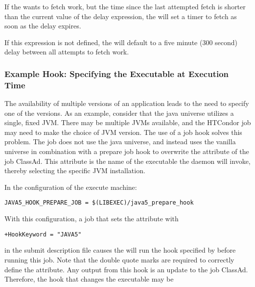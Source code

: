 If the  wants to fetch work, but the time since the
last attempted fetch is shorter than the current value of the delay
expression, the  will set a timer to fetch as soon as
the delay expires.

If this expression is not defined, the  will default to
a five minute (300 second) delay between all attempts to fetch work.

\subsubsection{\label{sec:job-hooks-example}
Example Hook: Specifying the Executable at Execution Time}

The availability of multiple versions of an application leads to
the need to specify one of the versions. 
As an example, consider that 
the java universe utilizes a single, fixed JVM.
There may be multiple JVMs available, and the HTCondor job may
need to make the choice of JVM version.
The use of a job hook solves this problem.
The job does not use the java universe, and instead uses the
vanilla universe in combination with a 
prepare job hook to overwrite the  attribute of the job ClassAd.
This attribute is the name of the
executable the  daemon will invoke,
thereby selecting the specific JVM installation.

In the configuration of the execute machine:

\footnotesize
\begin{verbatim}
JAVA5_HOOK_PREPARE_JOB = $(LIBEXEC)/java5_prepare_hook
\end{verbatim}
\normalsize

With this configuration, a job that sets the  attribute with

\begin{verbatim}
+HookKeyword = "JAVA5"
\end{verbatim}

in the submit description file causes the 
will run the hook specified by 
before running this job.
Note that the double quote marks are required to correctly define
the attribute.
Any output from this hook is an update to the job ClassAd.  
Therefore, the hook that changes the executable may be

